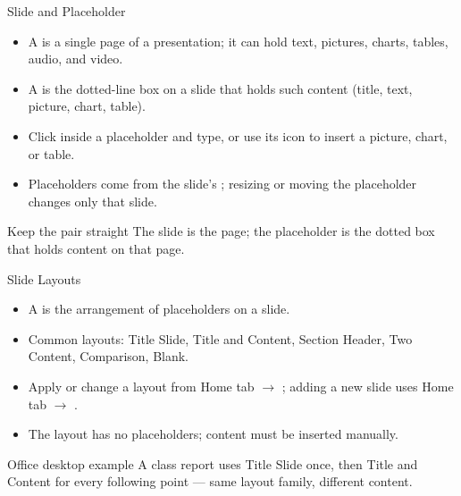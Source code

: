 \documentclass[aspectratio=169]{beamer}
\begin{document}
\begin{frame}{Slide and Placeholder}
  \begin{itemize}
    \item A  is a single page of a presentation; it can hold text,
      pictures, charts, tables, audio, and video.
    \item A  is the dotted-line box on a slide that holds
      such content (title, text, picture, chart, table).
    \item Click inside a placeholder and type, or use its icon to insert a
      picture, chart, or table.
    \item Placeholders come from the slide's ; resizing or moving
      the placeholder changes only that slide.
  \end{itemize}
  \begin{block}{Keep the pair straight}
    The slide is the page; the placeholder is the dotted box that holds content
    on that page.
  \end{block}
\end{frame}

\begin{frame}{Slide Layouts}
  \begin{itemize}
    \item A  is the arrangement of placeholders on a slide.
    \item Common layouts: Title Slide, Title and Content, Section Header, Two
      Content, Comparison, Blank.
    \item Apply or change a layout from Home tab $\rightarrow$ ;
      adding a new slide uses Home tab $\rightarrow$ .
    \item The  layout has no placeholders; content must be inserted
      manually.
  \end{itemize}
  \begin{block}{Office desktop example}
    A class report uses Title Slide once, then Title and Content for every
    following point --- same layout family, different content.
  \end{block}
\end{frame}
\end{document}
